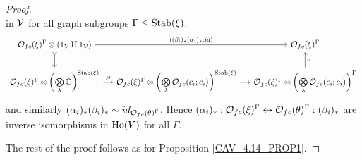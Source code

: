 \documentclass[a4paper,10pt
,draft
]{article}%
\renewcommand{\1}{\ensuremath{\mathbb{id}}}
\begin{document}
\begin{proof}
\begin{equation}
      \end{equation}
      in $\mathcal V$ for all graph subgroups $\Gamma \leq \mathrm{Stab}(\xi)$:
      \begin{equation}
            \begin{tikzcd}[column sep = small]
                  \O_{f c}(\ksi)^\Gamma \otimes (1_\V \amalg 1_\V) \arrow[d, tail] \arrow[rr, "{((\beta_i)_{\**}(\alpha_i)_{\**}, id)}"]
                  &&
                  \O_{f c}(\ksi)^\Gamma
                  \\                  
                  \O_{f c}(\ksi)^\Gamma \otimes \left(\bigotimes\limits_\lambda \mathbb C\right)^{\Stab(\ksi)}
                  \arrow[r, "H"]
                  &
                  \O_{f c}(\ksi)^\Gamma \otimes \left(\bigotimes\limits_\lambda \O_{f c}(c_i;c_i)\right)^{\Stab(\ksi)} \arrow[r]
                  &
                  \O_{f c}(\ksi)^\Gamma \otimes \left(\bigotimes\limits_\lambda \O_{f c}(c_i;c_i)\right)^{\Gamma} \arrow[u, "\circ"']                  
            \end{tikzcd}
      \end{equation}
      and similarly $(\alpha_i)_{\**}(\beta_i)_{\**} \sim id_{\O_{f c}(\theta)^\Gamma}$.
      Hence
      $(\alpha_i)_{\**}: \O_{f c}(\ksi)^\Gamma \leftrightarrow \O_{f c}(\theta)^\Gamma: (\beta_i)_{\**}$
      are inverse isomorphisms in $\operatorname{Ho}(V)$ for all $\Gamma$.

      The rest of the proof follows as for Proposition \ref{CAV_4.14_PROP1}.
      

\end{proof}
\end{document}
